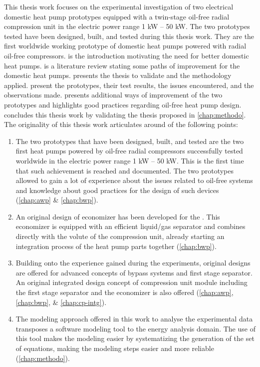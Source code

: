 This thesis work focuses on the experimental investigation of two
electrical domestic heat pump prototypes equipped with a twin-stage
oil-free radial compression unit in the electric power range 1 kW --
50 kW. The two prototypes tested have been designed, built, and tested
during this thesis work. They are the first worldwide working
prototype of domestic heat pumps powered with radial oil-free
compressors.  is the introduction motivating the need
for better domestic heat pumps.  is a literature
review stating some paths of improvement for the domestic heat
pumps.  presents the thesis to validate and the
methodology applied.  present the prototypes,
their test results, the issues encountered, and the observations
made.  presents additional ways of improvement of
the two prototypes and highlights good practices regarding oil-free
heat pump design.  concludes this thesis work by
validating the thesis proposed in \cref{chap:methodo}. The originality
of this thesis work articulates around of the following points:

\begin{enumerate}
\item The two prototypes that have been designed, built, and tested
  are the two first heat pumps powered by oil-free radial compressors
  successfully tested worldwide in the electric power range 1 kW -- 50
  kW. This is the first time that such achievement is reached and
  documented. The two prototypes allowed to gain a lot of experience
  about the issues related to oil-free systems and knowledge about
  good practices for the design of such devices (\cref{chap:awp} \&
  \cref{chap:bwp}).
\item An original design of economizer has been developed for the
  \AWP{}. This economizer is equipped with an efficient liquid/gas
  separator and combines directly with the volute of the compression
  unit, already starting an integration process of the heat pump parts
  together (\cref{chap:bwp}).
\item Building onto the experience gained during the experiments,
  original designs are offered for advanced concepts of bypass systems
  and first stage separator. An original integrated design concept of
  compression unit module including the first stage separator and the
  economizer is also offered (\cref{chap:awp}, \cref{chap:bwp}, \&
  \cref{chap:cp-intg}).
\item The modeling approach offered in this work to analyse the
  experimental data transposes a software modeling tool to the energy
  analysis domain. The use of this tool makes the modeling easier by
  systematizing the generation of the set of equations, making the
  modeling steps easier and more reliable (\cref{chap:methodo}).
\end{enumerate}


